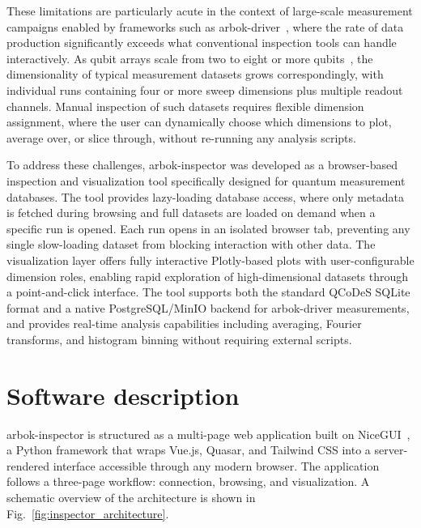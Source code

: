 These limitations are particularly acute in the context of large-scale measurement campaigns enabled by frameworks such as arbok-driver~\cite{nickl2025arbok}, where the rate of data production significantly exceeds what conventional inspection tools can handle interactively.
As qubit arrays scale from two to eight or more qubits~\cite{nickl2025eight}, the dimensionality of typical measurement datasets grows correspondingly, with individual runs containing four or more sweep dimensions plus multiple readout channels.
Manual inspection of such datasets requires flexible dimension assignment, where the user can dynamically choose which dimensions to plot, average over, or slice through, without re-running any analysis scripts.

To address these challenges, arbok-inspector was developed as a browser-based inspection and visualization tool specifically designed for quantum measurement databases.
The tool provides lazy-loading database access, where only metadata is fetched during browsing and full datasets are loaded on demand when a specific run is opened.
Each run opens in an isolated browser tab, preventing any single slow-loading dataset from blocking interaction with other data.
The visualization layer offers fully interactive Plotly-based plots with user-configurable dimension roles, enabling rapid exploration of high-dimensional datasets through a point-and-click interface.
The tool supports both the standard QCoDeS SQLite format and a native PostgreSQL/MinIO backend for arbok-driver measurements, and provides real-time analysis capabilities including averaging, Fourier transforms, and histogram binning without requiring external scripts.

\section{Software description}

arbok-inspector is structured as a multi-page web application built on NiceGUI~\cite{nicegui}, a Python framework that wraps Vue.js, Quasar, and Tailwind CSS into a server-rendered interface accessible through any modern browser.
The application follows a three-page workflow: connection, browsing, and visualization.
A schematic overview of the architecture is shown in Fig.~\ref{fig:inspector_architecture}.


